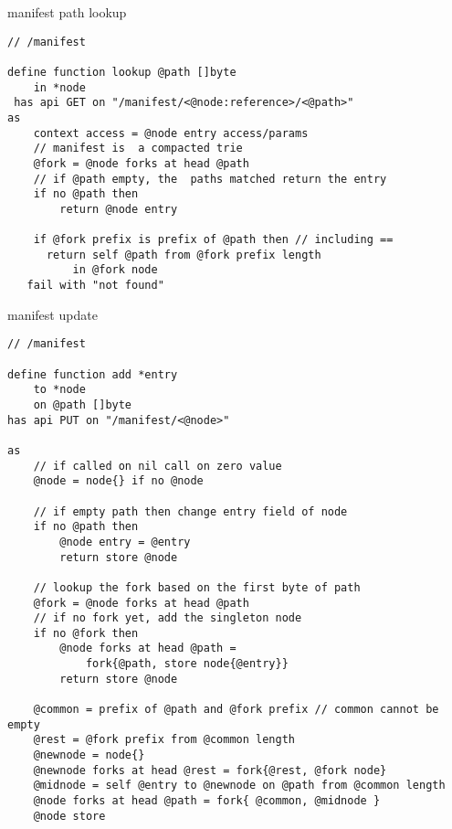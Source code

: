 \begin{definition}{manifest path lookup}\label{def:manifests-lookup}
\begin{lstlisting}[language=buzz1]
// /manifest

define function lookup @path []byte
    in *node
 has api GET on "/manifest/<@node:reference>/<@path>"
as 
    context access = @node entry access/params 
    // manifest is  a compacted trie
    @fork = @node forks at head @path 
    // if @path empty, the  paths matched return the entry
    if no @path then 
        return @node entry

    if @fork prefix is prefix of @path then // including == 
      return self @path from @fork prefix length
          in @fork node 
   fail with "not found"

\end{lstlisting}
\end{definition}


\begin{definition}{manifest update}\label{def:manifest-update}
\begin{lstlisting}[language=buzz1]
// /manifest

define function add *entry  
    to *node 
    on @path []byte 
has api PUT on "/manifest/<@node>"
    
as
    // if called on nil call on zero value
    @node = node{} if no @node 

    // if empty path then change entry field of node
    if no @path then
        @node entry = @entry
        return store @node

    // lookup the fork based on the first byte of path
    @fork = @node forks at head @path
    // if no fork yet, add the singleton node 
    if no @fork then
        @node forks at head @path =
            fork{@path, store node{@entry}}
        return store @node

    @common = prefix of @path and @fork prefix // common cannot be empty
    @rest = @fork prefix from @common length
    @newnode = node{}
    @newnode forks at head @rest = fork{@rest, @fork node}
    @midnode = self @entry to @newnode on @path from @common length 
    @node forks at head @path = fork{ @common, @midnode } 
    @node store
    

\end{lstlisting}
\end{definition}

